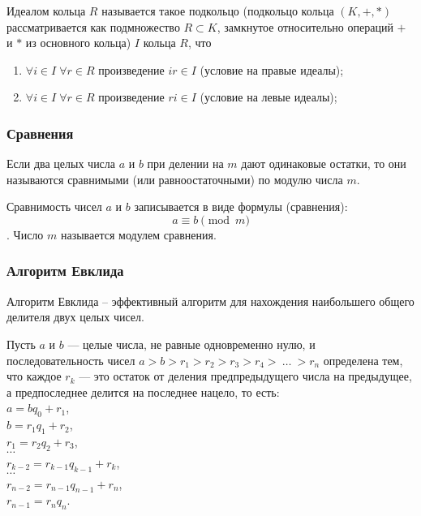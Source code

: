 \documentclass[12pt]{matmex-diploma}
\begin{document}
            Идеалом кольца $R$ называется такое подкольцо (подкольцо кольца $(K,+,*)$ рассматривается как подмножество $R\subset K$, замкнутое относительно операций $+$ и $*$ из основного кольца) $I$ кольца $R$, что
            \begin{enumerate}
                \item $\forall i\in I\;\forall r\in R$ произведение $ir\in I$ (условие на правые идеалы);
                \item $\forall i\in I\;\forall r\in R$ произведение $ri\in I$ (условие на левые идеалы);
            \end{enumerate}             
            
        \subsubsection*{Сравнения}
            Если два целых числа $a$ и $b$ при делении на $m$ дают одинаковые остатки, то они называются сравнимыми (или равноостаточными) по модулю числа $m$.
            
            Сравнимость чисел $a$ и $b$ записывается в виде формулы (сравнения): $$a\equiv b{\pmod  {m}}$$. Число $m$ называется модулем сравнения.
            
        \subsubsection*{Алгоритм Евклида}
            Алгоритм Евклида – эффективный алгоритм для нахождения наибольшего общего делителя двух целых чисел.
            
            Пусть $a$ и $b$ — целые числа, не равные одновременно нулю, и последовательность чисел $a>b>r_{1}>r_{2}>r_{3}>r_{4}>\ \dots \ >r_{n}$ определена тем, что каждое $r_{k}$ — это остаток от деления предпредыдущего числа на предыдущее, а предпоследнее делится на последнее нацело, то есть:
            \\$a=bq_{0}+r_{1}$,
            \\$b=r_{1}q_{1}+r_{2}$,
            \\$r_{1}=r_{2}q_{2}+r_{3}$,
            \\$\cdots$ 
            \\$r_{k-2}=r_{k-1}q_{k-1}+r_{k}$,
            \\$\cdots $
            \\$r_{n-2}=r_{n-1}q_{n-1}+r_{n}$,
            \\$r_{n-1}=r_{n}q_{n}$.
            
\end{document}
